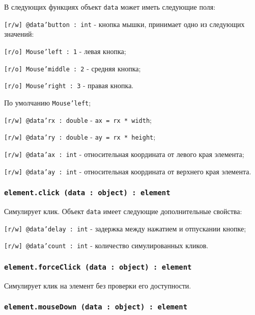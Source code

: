 В следующих функциях объект \texttt{data} может иметь следующие поля:
\begin{icItems}
	\item \texttt{[r/w] @data'button : int} - кнопка мышки, принимает одно из следующих значений:
	\begin{icItems}
		\item \texttt{[r/o] Mouse'left : 1} - левая кнопка;
		\item \texttt{[r/o] Mouse'middle : 2} - средняя кнопка;
		\item \texttt{[r/o] Mouse'right : 3} - правая кнопка.
	\end{icItems}
	По умолчанию \texttt{Mouse'left};
	\item \texttt{[r/w] @data'rx : double} - \texttt{ax = rx * width};
	\item \texttt{[r/w] @data'ry : double} - \texttt{ay = rx * height};
	\item \texttt{[r/w] @data'ax : int} - относительная координата от левого края элемента;
	\item \texttt{[r/w] @data'ay : int} - относительная координата от верхнего края элемента.
\end{icItems}

\subsubsection{\texttt{element.click (data : object) : element}}

Симулирует клик. Объект \texttt{data} имеет следующие дополнительные свойства:
\begin{icItems}
	\item \texttt{[r/w] @data'delay : int} - задержка между нажатием и отпускании кнопке;
	\item \texttt{[r/w] @data'count : int} - количество симулированных кликов.
\end{icItems}

\subsubsection{\texttt{element.forceClick (data : object) : element}}

Симулирует клик на элемент без проверки его доступности.

\subsubsection{\texttt{element.mouseDown (data : object) : element}}

